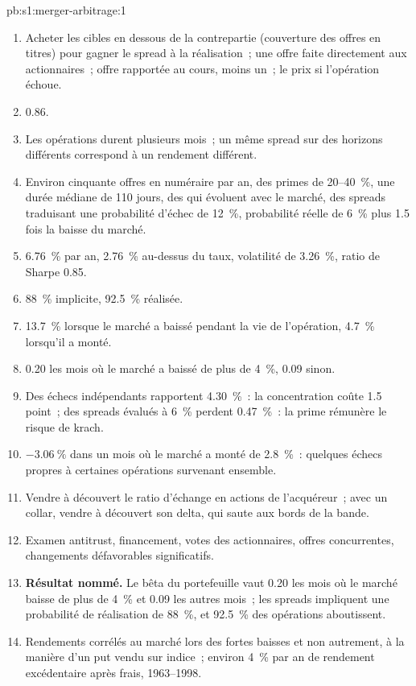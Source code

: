 \begin{solution}{pb:s1:merger-arbitrage:1}
\begin{enumerate}
\item Acheter les cibles en dessous de la contrepartie (couverture des offres en titres) pour gagner le spread à la réalisation~; une offre faite directement aux actionnaires~; offre rapportée au cours,
moins un~; le prix si l'opération échoue.
\item 0.86.
\item Les opérations durent plusieurs mois~; un même spread sur des horizons différents correspond à un rendement différent.
\item Environ cinquante offres en numéraire par an, des primes de 20--40~\%, une durée médiane de 110 jours, des  qui évoluent avec le marché, des spreads traduisant une probabilité
d'échec de 12~\%, probabilité réelle de 6~\% plus 1.5 fois la baisse du marché.
\item 6.76~\% par an, 2.76~\% au-dessus du taux, volatilité de 3.26~\%, ratio de Sharpe 0.85.
\item 88~\% implicite, 92.5~\% réalisée.
\item 13.7~\% lorsque le marché a baissé pendant la vie de l'opération, 4.7~\% lorsqu'il a monté.
\item 0.20 les mois où le marché a baissé de plus de 4~\%, 0.09 sinon.
\item Des échecs indépendants rapportent 4.30~\%~: la concentration coûte 1.5 point~; des spreads évalués à 6~\% perdent 0.47~\%~: la prime rémunère le risque de krach.
\item $-3.06~\%$ dans un mois où le marché a monté de 2.8~\%~: quelques échecs propres à certaines opérations survenant ensemble.
\item Vendre à découvert le ratio d'échange en actions de l'acquéreur~; avec un collar, vendre à découvert son delta, qui saute aux bords de la bande.
\item Examen antitrust, financement, votes des actionnaires, offres concurrentes, changements défavorables significatifs.
\item \textbf{Résultat nommé.} Le bêta du portefeuille vaut 0.20 les mois où le marché baisse de plus de 4~\% et 0.09 les autres mois~; les spreads impliquent une
probabilité de réalisation de 88~\%, et 92.5~\% des opérations aboutissent.
\item Rendements corrélés au marché lors des fortes baisses et non autrement, à la manière d'un put vendu sur indice~; environ 4~\% par an de rendement excédentaire après frais, 1963--1998.

\end{enumerate}
\end{solution}
